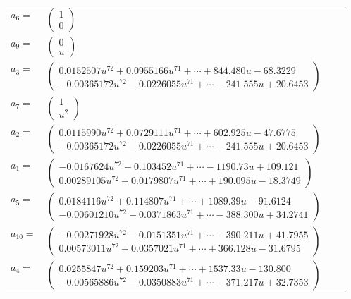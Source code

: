 \documentclass[1p]{elsarticle_modified}
\theoremstyle{definition}
\begin{document}
\begin{tabular}{m{7pt} m{180pt} m{7pt} m{180pt} }
\flushright $a_{6}=$&$\begin{pmatrix}1\\0\end{pmatrix}$ \\
\flushright $a_{9}=$&$\begin{pmatrix}0\\u\end{pmatrix}$ \\
\flushright $a_{3}=$&$\begin{pmatrix}0.0152507 u^{72}+0.0955166 u^{71}+\cdots+844.480 u-68.3229\\-0.00365172 u^{72}-0.0226055 u^{71}+\cdots-241.555 u+20.6453\end{pmatrix}$ \\
\flushright $a_{7}=$&$\begin{pmatrix}1\\u^2\end{pmatrix}$ \\
\flushright $a_{2}=$&$\begin{pmatrix}0.0115990 u^{72}+0.0729111 u^{71}+\cdots+602.925 u-47.6775\\-0.00365172 u^{72}-0.0226055 u^{71}+\cdots-241.555 u+20.6453\end{pmatrix}$ \\
\flushright $a_{1}=$&$\begin{pmatrix}-0.0167624 u^{72}-0.103452 u^{71}+\cdots-1190.73 u+109.121\\0.00289105 u^{72}+0.0179807 u^{71}+\cdots+190.095 u-18.3749\end{pmatrix}$ \\
\flushright $a_{5}=$&$\begin{pmatrix}0.0184116 u^{72}+0.114807 u^{71}+\cdots+1089.39 u-91.6124\\-0.00601210 u^{72}-0.0371863 u^{71}+\cdots-388.300 u+34.2741\end{pmatrix}$ \\
\flushright $a_{10}=$&$\begin{pmatrix}-0.00271928 u^{72}-0.0151351 u^{71}+\cdots-390.211 u+41.7955\\0.00573011 u^{72}+0.0357021 u^{71}+\cdots+366.128 u-31.6795\end{pmatrix}$ \\
\flushright $a_{4}=$&$\begin{pmatrix}0.0255847 u^{72}+0.159203 u^{71}+\cdots+1537.33 u-130.800\\-0.00565886 u^{72}-0.0350883 u^{71}+\cdots-371.217 u+32.7353\end{pmatrix}$ \\

\end{tabular}
\end{document}
